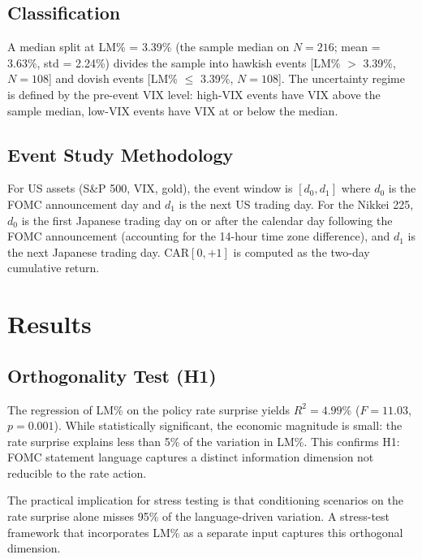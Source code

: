 \documentclass[11pt]{article}
\begin{document}
\subsection{Classification}

A median split at LM\% = 3.39\% (the sample median on $N = 216$; mean = 3.63\%, std = 2.24\%) divides the sample into hawkish events [LM\% $>$ 3.39\%, $N = 108$] and dovish events [LM\% $\leq$ 3.39\%, $N = 108$]. The uncertainty regime is defined by the pre-event VIX level: high-VIX events have VIX above the sample median, low-VIX events have VIX at or below the median.

\subsection{Event Study Methodology}

For US assets (S\&P 500, VIX, gold), the event window is $[d_0, d_1]$ where $d_0$ is the FOMC announcement day and $d_1$ is the next US trading day. For the Nikkei 225, $d_0$ is the first Japanese trading day on or after the calendar day following the FOMC announcement (accounting for the 14-hour time zone difference), and $d_1$ is the next Japanese trading day. CAR$[0,+1]$ is computed as the two-day cumulative return.

\section{Results}

\subsection{Orthogonality Test (H1)}

The regression of LM\% on the policy rate surprise yields $R^2 = 4.99\%$ ($F = 11.03$, $p = 0.001$). While statistically significant, the economic magnitude is small: the rate surprise explains less than 5\% of the variation in LM\%. This confirms H1: FOMC statement language captures a distinct information dimension not reducible to the rate action.

The practical implication for stress testing is that conditioning scenarios on the rate surprise alone misses 95\% of the language-driven variation. A stress-test framework that incorporates LM\% as a separate input captures this orthogonal dimension.
\end{document}
